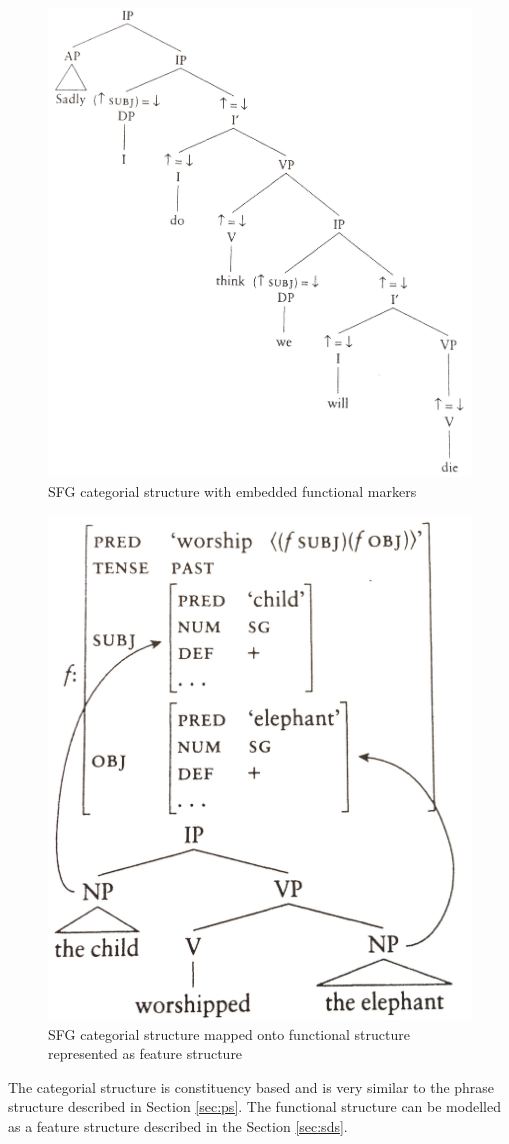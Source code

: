 \documentclass[11pt,a4paper,titlepage]{article}
\begin{document}
\begin{figure}[H]
	\centering
	\includegraphics[width=0.6\linewidth]{pics/lfs-example2}
	\caption{SFG categorial structure with embedded functional markers}
	\label{fig:sfg-cstruct}
\end{figure}

\begin{figure}[H]
	\centering
	\includegraphics[width=0.6\linewidth]{pics/lfs-example1}
	\caption{SFG categorial structure mapped onto functional structure represented as feature structure}
	\label{fig:sfg-fstruct}
\end{figure}

The categorial structure is constituency based and is very similar to the phrase structure described in Section \ref{sec:ps}. The functional structure can be modelled as a feature structure described in the Section \ref{sec:sds}. 
\end{document}
